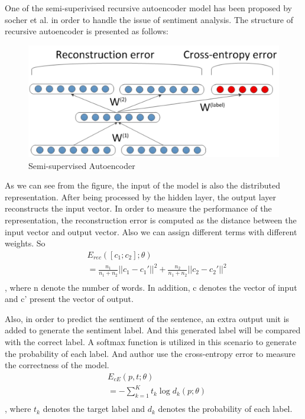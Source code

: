 \documentclass[dvips,9pt]{article}
\begin{document}
One of the semi-superivised recursive autoencoder model has been proposed by socher et al.\cite{socher2011semi} in order to handle the issue of sentiment analysis. The structure of recursive autoencoder is presented as follows:
\begin{figure}[ht]
\centering
\includegraphics[width = 1.0\linewidth]{figure/semiautoencoder}
\caption{Semi-supervised Autoencoder}
\label{fig:sae}
\end{figure}	
	
As we can see from the figure, the input of the model is also the distributed representation. After being processed by the hidden layer, the output layer reconstructs the input vector. In order to measure the performance of the representation, the reconstruction error is computed as the distance between the input vector and output vector. Also we can assign different terms with different weights. So
\begin{equation}
\begin{split}
 & E_{rec}([c_{1};c_{2}];\theta) \\
 & = \frac{n_{1}}{n_{1}+n_{2}} ||c_{1}-c_{1}'||^2 + \frac{n_{2}}{n_{1}+n_{2}} ||c_{2}-c_{2}'||^2\\
 \end{split}
\end{equation}
, where n denote the number of words. In addition, c denotes the vector of input and c' present the vector of output.

Also, in order to predict the sentiment of the sentence, an extra output unit is added to generate the sentiment label. And this generated label will be compared with the correct label. A softmax function is utilized in this scenario to generate the probability of each label. And author use the cross-entropy error to measure the correctness of the model.
\begin{equation}
\begin{split}
 & E_{cE}(p,t;\theta) \\
 & = -\sum_{k=1}^{K}{t_{k}\log{}d_{k}(p;\theta)}\\
 \end{split}
\end{equation}
, where $t_{k}$ denotes the target label and $d_{k}$ denotes the probability of each label.
\end{document}

